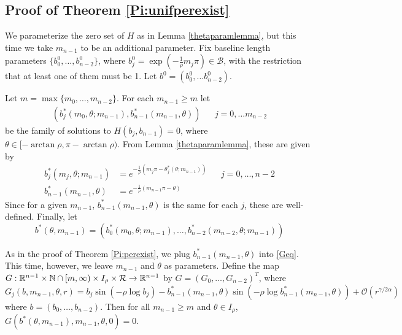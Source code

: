 \documentclass[thesis.tex]{subfiles}
\begin{document}
\subsection{Proof of Theorem \ref{Pi:unifperexist}}

We parameterize the zero set of $H$ as in Lemma \ref{thetaparamlemma}, but this time we take $m_{n-1}$ to be an additional parameter. Fix baseline length parameters $\{ b_0^0, \dots, b_{n-2}^0 \}$, where $b_j^0 = \exp(-\frac{1}{\rho}m_j \pi) \in \mathcal{B}$, with the restriction that at least one of them must be 1. Let $b^0 = (b_0^0, \dots b_{n-2}^0)$.

Let $m = \max\{ m_0, \dots, m_{n-2} \}$. For each $m_{n-1} \geq m$ let
\begin{align}
(b_j^*(m_0, \theta; m_{n-1}), b_{n-1}^*(m_{n-1}, \theta)) && j = 0, \dots m_{n-2}
\end{align}
be the family of solutions to $H(b_j, b_{n-1}) = 0$, where $\theta \in [-\arctan \rho, \pi - \arctan \rho)$. From Lemma \ref{thetaparamlemma}, these are given by
\begin{equation}\label{bstarm}
\begin{aligned}
b_j^*(m_j, \theta; m_{n-1}) &= e^{-\frac{1}{\rho}(m_j \pi - \theta_j^*(\theta; m_{n-1}))} && j = 0, \dots, n-2 \\
b_{n-1}^*(m_{n-1}, \theta) &= e^{-\frac{1}{\rho}(m_{n-1}\pi - \theta)}
\end{aligned}
\end{equation}
Since for a given $m_{n-1}$, $b_{n-1}^*(m_{n-1}, \theta)$ is the same for each $j$, these are well-defined. Finally, let
\begin{equation}\label{defbstar}
b^*(\theta, m_{n-1}) = 
\left( b_0^*(m_0, \theta; m_{n-1}), \dots, b_{n-2}^*(m_{n-2}, \theta; m_{n-1}) \right)
\end{equation}

As in the proof of Theorem \ref{Pi:perexist}, we plug $b_{n-1}^*(m_{n-1}, \theta)$ into \eqref{Geq}. This time, however, we leave $m_{n-1}$ and $\theta$ as parameters. Define the map $G: {\mathbb R}^{n-1} \times {\mathbb N} \cap [m, \infty) \times I_\rho \times \mathcal{R} \rightarrow {\mathbb R}^{n-1}$ by $G = (G_0, \dots, G_{n-2})^T$, where 
\begin{equation}\label{Gdef2}
G_j(b, m_{n-1}, \theta, r) = b_j \sin \left( -\rho \log b_j \right) - b_{n-1}^*(m_{n-1}, \theta) \sin \left( -\rho \log b_{n-1}^*(m_{n-1}, \theta) \right) + \mathcal{O}(r^{\gamma / 2 \alpha})
\end{equation}
where $b = (b_0, \dots, b_{n-2})$. Then for all $m_{n-1} \geq m$ and $\theta \in I_\rho$, $G(b^*(\theta, m_{n-1}), m_{n-1}, \theta, 0) = 0$.
\end{document}
